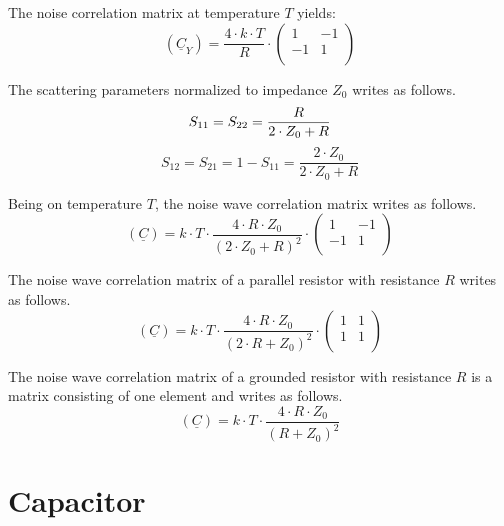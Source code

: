 The noise correlation matrix at temperature $T$ yields:
\begin{equation}
(\underline{C}_Y) = \frac{4\cdot k\cdot T}{R} \cdot
\begin{pmatrix}
 1 & -1 \\
-1 &  1 \\
\end{pmatrix}
\end{equation}

The scattering parameters normalized to impedance $Z_0$
writes as follows.
\begin{equation}
S_{11} = S_{22} = \frac{R}{2\cdot Z_0+R} \\
\end{equation}
\begin{equation}
S_{12} = S_{21} = 1-S_{11} = \frac{2\cdot Z_0}{2\cdot Z_0+R}
\end{equation}

Being on temperature $T$, the noise wave correlation matrix
writes as follows.
\begin{equation}
(\underline{C}) = k\cdot T\cdot\frac{4\cdot R\cdot Z_0}{(2\cdot Z_0+R)^2}\cdot
\begin{pmatrix}
   1 & -1\\
  -1 &  1\\
\end{pmatrix}
\end{equation}

The noise wave correlation matrix of a parallel resistor with resistance $R$
writes as follows.
\begin{equation}
(\underline{C}) = k\cdot T\cdot\frac{4\cdot R\cdot Z_0}{(2\cdot R+Z_0)^2}\cdot
\begin{pmatrix}
  1 & 1\\
  1 & 1\\
\end{pmatrix}
\end{equation}

The noise wave correlation matrix of a grounded resistor with resistance $R$
is a matrix consisting of one element and writes as follows.
\begin{equation}
(\underline{C}) = k\cdot T\cdot\frac{4\cdot R\cdot Z_0}{(R+Z_0)^2}
\end{equation}


\section{Capacitor}

